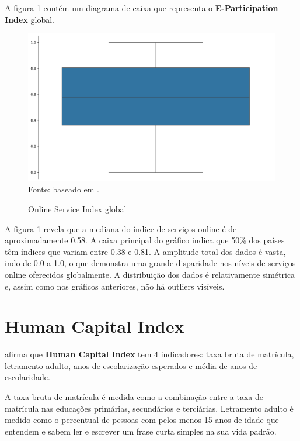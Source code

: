 A figura \ref{fig:boxplot_osi_global} contém um diagrama de caixa que representa o \textbf{E-Participation Index} global.

\begin{figure}[H]
	\centering
	\caption{Online Service Index global}
	\includegraphics[width=1\linewidth]{figuras/egdi/boxplot_osi_global.png}
	\label{fig:boxplot_osi_global}
	\footnotesize{Fonte: baseado em \cite{ONU_EGDI_mapa}.}
\end{figure}

A figura \ref{fig:boxplot_osi_global} revela que a mediana do índice de serviços online é de aproximadamente 0.58. A caixa principal do gráfico indica que 50\% dos países têm índices que variam entre 0.38 e 0.81. A amplitude total dos dados é vasta, indo de 0.0 a 1.0, o que demonstra uma grande disparidade nos níveis de serviços online oferecidos globalmente. A distribuição dos dados é relativamente simétrica e, assim como nos gráficos anteriores, não há outliers visíveis.

\section{Human Capital Index}
\label{hci}

\cite{ONU_EGDI_methodology} afirma que \textbf{Human Capital Index} tem 4 indicadores: taxa bruta de matrícula, letramento adulto, anos de escolarização esperados e média de anos de escolaridade. 

A taxa bruta de matrícula é medida como a combinação entre a taxa de matrícula nas educações primárias, secundários e terciárias. Letramento adulto é medido como o percentual de pessoas com pelos menos 15 anos de idade que entendem e sabem ler e escrever um frase curta simples na sua vida padrão.


